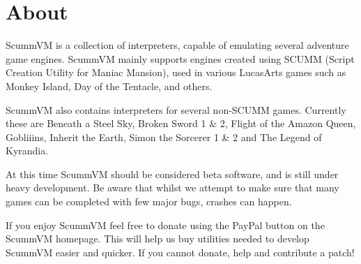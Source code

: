 


\section{About}

ScummVM is a collection of interpreters, capable of emulating several
adventure game engines. ScummVM mainly supports engines created using 
SCUMM (Script Creation Utility for Maniac Mansion), used in various
LucasArts games such as Monkey Island, Day of the Tentacle, and others.

ScummVM also contains interpreters for several non-SCUMM games. Currently
these are Beneath a Steel Sky, Broken Sword 1 \& 2, Flight of the Amazon Queen,
Gobliiins, Inherit the Earth, Simon the Sorcerer 1 \& 2 and The Legend of
Kyrandia.

At this time ScummVM should be considered beta software, and is still
under heavy development. Be aware that whilst we attempt to make sure
that many games can be completed with few major bugs, crashes can happen.

If you enjoy ScummVM feel free to donate using the PayPal button on the
ScummVM homepage. This will help us buy utilities needed to develop ScummVM
easier and quicker. If you cannot donate, help and contribute a patch!
